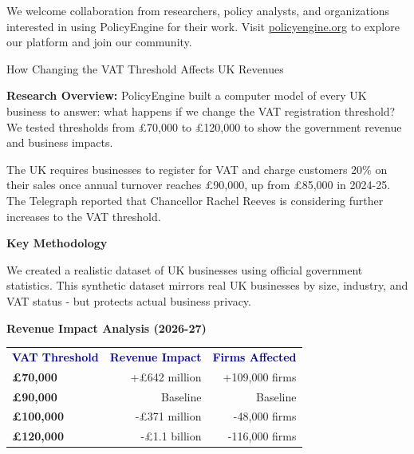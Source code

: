 \documentclass[a4paper,11pt]{article}
\newcommand{\highlightbox}[1]{%
    \begin{tcolorbox}[
        colback=lightblue,
        colframe=darkblue,
        leftrule=4mm,
        rightrule=0mm,
        toprule=0mm,
        bottomrule=0mm,
        sharp corners
    ]
    #1
    \end{tcolorbox}
}
\begin{document}
We welcome collaboration from researchers, policy analysts, and organizations interested in using PolicyEngine for their work. Visit \href{https://policyengine.org}{policyengine.org} to explore our platform and join our community.

\newpage

\vspace{20pt}

\begin{tcolorbox}[
    colback=darkblue,
    colframe=darkblue,
    fontupper=\color{white}\Large\bfseries
]
How Changing the VAT Threshold Affects UK Revenues
\end{tcolorbox}

\vspace{15pt}

\vspace{10pt}

\highlightbox{
\textbf{Research Overview:} PolicyEngine built a computer model of every UK business to answer: what happens if we change the VAT registration threshold? We tested thresholds from £70,000 to £120,000 to show the government revenue and business impacts.
}

\vspace{15pt}

The UK requires businesses to register for VAT and charge customers 20\% on their sales once annual turnover reaches £90,000, up from £85,000 in 2024-25. The Telegraph reported that Chancellor Rachel Reeves is considering further increases to the VAT threshold.

\vspace{15pt}

\textbf{Key Methodology}

We created a realistic dataset of UK businesses using official government statistics. This synthetic dataset mirrors real UK businesses by size, industry, and VAT status - but protects actual business privacy.

\vspace{15pt}

\begin{tcolorbox}[
    colback=lightgray,
    colframe=mediumblue,
    rounded corners,
    leftrule=3mm,
    rightrule=0mm,
    toprule=0mm,
    bottomrule=0mm
]
\textbf{\color{darkblue}Revenue Impact Analysis (2026-27)}

\vspace{10pt}

\begin{tabular}{l r r}
\textcolor{darkblue}{\textbf{VAT Threshold}} & \textcolor{darkblue}{\textbf{Revenue Impact}} & \textcolor{darkblue}{\textbf{Firms Affected}} \\[8pt]
\textbf{£70,000} & +£642 million & +109,000 firms \\
\textbf{£90,000} & Baseline & Baseline \\
\textbf{£100,000} & -£371 million & -48,000 firms \\
\textbf{£120,000} & -£1.1 billion & -116,000 firms \\
\end{tabular}
\end{tcolorbox}
\end{document}
